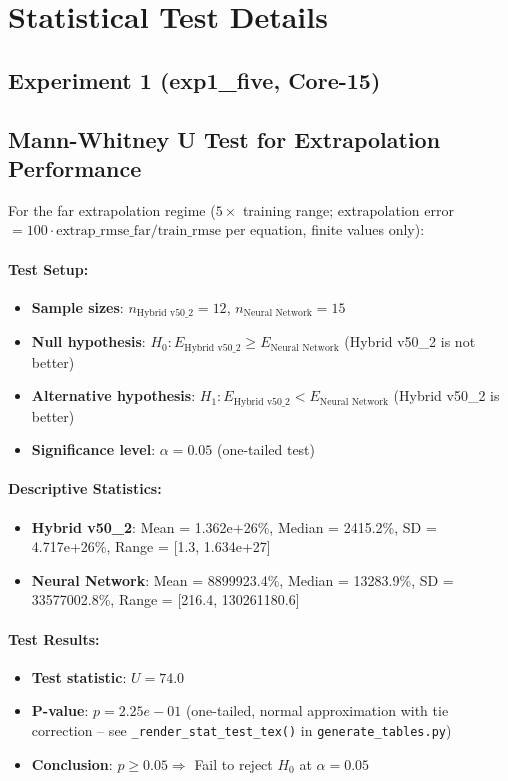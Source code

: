 \documentclass[twoside,11pt]{article}
\begin{document}
\section{Statistical Test Details}
\label{app:statistical_tests}

\subsection*{Experiment 1 (exp1\_five, Core-15)}

\subsection{Mann-Whitney U Test for Extrapolation Performance}

For the far extrapolation regime ($5\times$ training range; extrapolation error $=100\cdot\mathrm{extrap\_rmse\_far}/\mathrm{train\_rmse}$ per equation, finite values only):

\paragraph{Test Setup:}
\begin{itemize}
\item \textbf{Sample sizes}: $n_{\text{Hybrid v50\_2}} = 12$, $n_{\text{Neural Network}} = 15$
\item \textbf{Null hypothesis}: $H_0: E_{\text{Hybrid v50\_2}} \geq E_{\text{Neural Network}}$ (Hybrid v50\_2 is not better)
\item \textbf{Alternative hypothesis}: $H_1: E_{\text{Hybrid v50\_2}} < E_{\text{Neural Network}}$ (Hybrid v50\_2 is better)
\item \textbf{Significance level}: $\alpha = 0.05$ (one-tailed test)
\end{itemize}

\paragraph{Descriptive Statistics:}
\begin{itemize}
\item \textbf{Hybrid v50\_2}: Mean = 1.362e+26\%, Median = 2415.2\%, SD = 4.717e+26\%, Range = [1.3, 1.634e+27]
\item \textbf{Neural Network}: Mean = 8899923.4\%, Median = 13283.9\%, SD = 33577002.8\%, Range = [216.4, 130261180.6]
\end{itemize}

\paragraph{Test Results:}
\begin{itemize}
\item \textbf{Test statistic}: $U = 74.0$
\item \textbf{P-value}: $p = 2.25e-01$ (one-tailed, normal approximation with tie correction -- see \texttt{\_render\_stat\_test\_tex()} in \texttt{generate\_tables.py})
\item \textbf{Conclusion}: $p \geq 0.05 \Rightarrow$ Fail to reject $H_0$ at $\alpha = 0.05$
\end{itemize}
\end{document}
